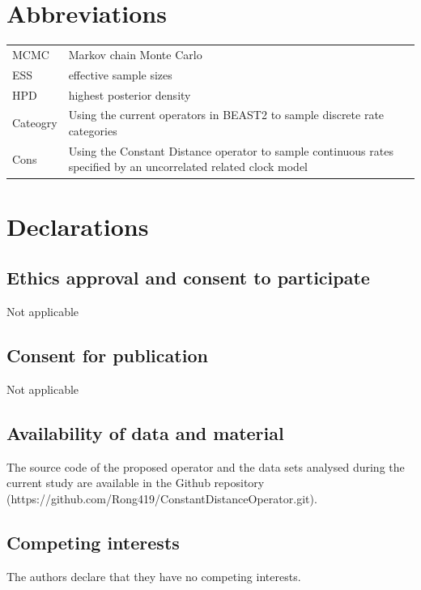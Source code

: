 \documentclass{bmcart}
\begin{document}
\begin{backmatter}
\section*{Abbreviations}
\begin{table}[h!]
\raggedright
\begin{tabular}{ll}
MCMC&Markov chain Monte Carlo\\
ESS&effective sample sizes\\ 
HPD&highest posterior density\\
Cateogry & Using the current operators in BEAST2 to sample discrete rate categories\\
Cons & Using the Constant Distance operator to sample continuous rates specified by an uncorrelated related clock model\\
\end{tabular}
\end{table}

\section*{Declarations}
\subsection*{Ethics approval and consent to participate}
Not applicable

\subsection*{Consent for publication}
Not applicable

\subsection*{Availability of data and material}
The source code of the proposed operator and the data sets analysed during the current study are available in the Github repository (https://github.com/Rong419/ConstantDistanceOperator.git).  

\subsection*{Competing interests}
The authors declare that they have no competing interests.


\end{backmatter}
\end{document}
